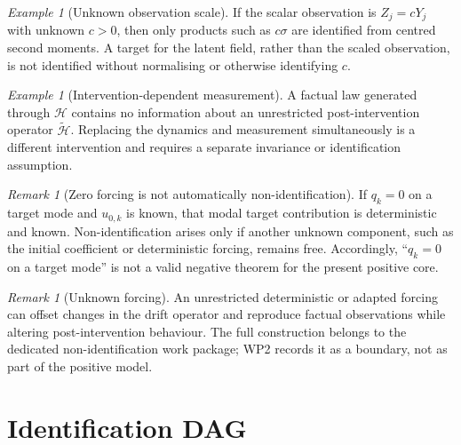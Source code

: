 \documentclass[11pt]{article}
\theoremstyle{remark}
\newtheorem{remark}[assumption]{Remark}
\newtheorem{example}[assumption]{Example}
\newcommand{\1}{\mathbf 1}
\begin{document}
\begin{example}[Unknown observation scale]\label{ex:unknown-H}
If the scalar observation is $Z_j=cY_j$ with unknown $c>0$, then only products such as $c\sigma$ are identified from centred second moments.  A target for the latent field, rather than the scaled observation, is not identified without normalising or otherwise identifying $c$.
\end{example}

\begin{example}[Intervention-dependent measurement]\label{ex:intervention-measurement}
A factual law generated through $\mathcal H$ contains no information about an unrestricted post-intervention operator $\widetilde{\mathcal H}$.  Replacing the dynamics and measurement simultaneously is a different intervention and requires a separate invariance or identification assumption.
\end{example}

\begin{remark}[Zero forcing is not automatically non-identification]
If $q_k=0$ on a target mode and $u_{0,k}$ is known, that modal target contribution is deterministic and known.  Non-identification arises only if another unknown component, such as the initial coefficient or deterministic forcing, remains free.  Accordingly, ``$q_k=0$ on a target mode'' is not a valid negative theorem for the present positive core.
\end{remark}

\begin{remark}[Unknown forcing]
An unrestricted deterministic or adapted forcing can offset changes in the drift operator and reproduce factual observations while altering post-intervention behaviour.  The full construction belongs to the dedicated non-identification work package; WP2 records it as a boundary, not as part of the positive model.
\end{remark}

\section{Identification DAG}
\end{document}
